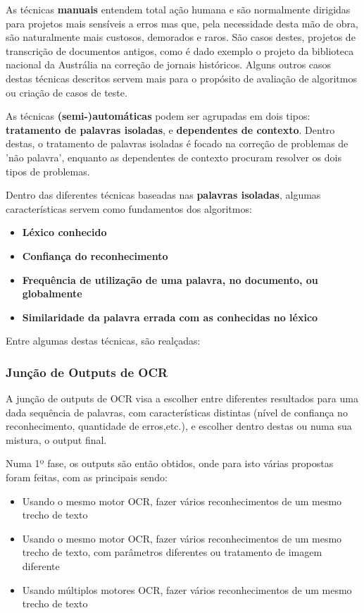 As técnicas \textbf{manuais} entendem total ação humana e são normalmente dirigidas para projetos mais sensíveis a erros mas que, pela necessidade desta mão de obra, são naturalmente mais custosos, demorados e raros. São casos destes, projetos de transcrição de documentos antigos, como é dado exemplo o projeto da biblioteca nacional da Austrália na correção de jornais históricos.
Alguns outros casos destas técnicas descritos servem mais para o propósito de avaliação de algoritmos ou criação de casos de teste.

As técnicas \textbf{(semi-)automáticas} podem ser agrupadas em dois tipos: \textbf{tratamento de palavras isoladas}, e \textbf{dependentes de contexto}. Dentro destas, o tratamento de palavras isoladas é focado na correção de problemas de 'não palavra', enquanto as dependentes de contexto procuram resolver os dois tipos de problemas.


Dentro das diferentes técnicas baseadas nas \textbf{palavras isoladas}, algumas características servem como fundamentos dos algoritmos:
\begin{itemize}
    \item \textbf{Léxico conhecido}
    \item \textbf{Confiança do reconhecimento}
    \item \textbf{Frequência de utilização de uma palavra, no documento, ou globalmente}
    \item \textbf{Similaridade da palavra errada com as conhecidas no léxico}
\end{itemize}
Entre algumas destas técnicas, são realçadas:

\subsubsection{Junção de Outputs de OCR}

A junção de outputs de OCR visa a escolher entre diferentes resultados para uma dada sequência de palavras, com características distintas (nível de confiança no reconhecimento, quantidade de erros,etc.), e escolher dentro destas ou numa sua mistura, o output final.

Numa 1º fase, os outputs são então obtidos, onde para isto várias propostas foram feitas, com as principais sendo: 
\begin{itemize}
    \item Usando o mesmo motor OCR, fazer vários reconhecimentos de um mesmo trecho de texto
    \item Usando o mesmo motor OCR, fazer vários reconhecimentos de um mesmo trecho de texto, com parâmetros diferentes ou tratamento de imagem diferente
    \item Usando múltiplos motores OCR, fazer vários reconhecimentos de um mesmo trecho de texto
\end{itemize}

